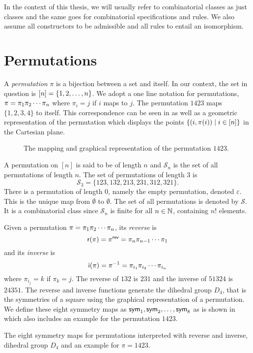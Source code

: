 In the context of this thesis, we will usually refer to combinatorial classes as just classes and the same goes for combinatorial specifications and rules. We also assume all constructors to be admissible and all rules to entail an isomorphism. 

\section{Permutations\label{sec:permutations}}
A \emph{permutation} $\pi$ is a bijection between a set and itself. In our context, the set in question is $[n] = \left\{1,2,\dotsc,n\right\}$. We adopt a one line notation for permutations, $\pi = \pi_1 \pi_2 \dotsm \pi_{n}$ where $\pi_i = j$ if $i$ maps to $j$. The permutation $1423$ maps $\{1,2,3,4\}$ to itself. This correspondence can be seen in  as well as a geometric representation of the permutation which displays the points $\left\{(i,\pi(i)) \mid i \in [n]\right\}$ in the Cartesian plane.

\begin{figure}[ht!]
    \centering
    
    \caption{The mapping and graphical representation of the permutation $1423$.}
    \label{fig:perm_example}
\end{figure}

A permutation on $[n]$ is said to be of length $n$ and $\mathcal{S}_n$ is the set of all permutations of length $n$. The set of permutations of length 3 is 
\[
    \mathcal{S}_3 = \{123,132,213,231,312,321\}.
\]
There is a permutation of length $0$, namely the empty permutation, denoted $\varepsilon$. This is the unique map from $\emptyset$ to $\emptyset$. The set of all permutations is denoted by $\mathcal{S}$. It is a combinatorial class since $\mathcal{S}_n$ is finite for all $n\in\mathbb{N}$, containing $n!$ elements.

Given a permutation $\pi = \pi_1 \pi_2 \dotsm \pi_{n}$, its \emph{reverse} is
\[
    \textsf{r}(\pi) = \pi^\textsf{rev} = \pi_{n} \pi_{n - 1} \dotsm \pi_1
\]
and its \emph{inverse} is
\[
    \textsf{i}(\pi) = \pi^{-1} = \pi_{i_1} \pi_{i_2} \dotsm \pi_{i_{n}}
\]
where $\pi_{i_j} = k$ if $\pi_k = j$. The reverse of $132$ is $231$ and the inverse of $51324$ is $24351$. The reverse and inverse functions generate the dihedral group $D_4$, that is the symmetries of a square using the graphical representation of a permutation. We define these eight symmetry maps as $\textsf{sym}_1,\textsf{sym}_2,\dotsc,\textsf{sym}_8$ as is shown in  which also includes an example for the permutation $1423$.

\begin{table}[ht!]
    \centering
    
    \caption{The eight symmetry maps for permutations interpreted with reverse and inverse, dihedral group $D_4$ and an example for $\pi=1423$.}
    \label{tab:permsym}
\end{table}

